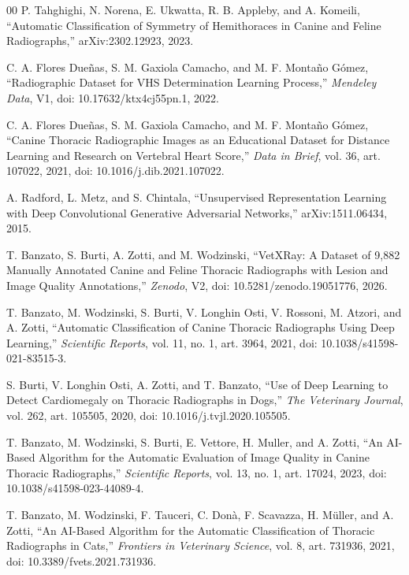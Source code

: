\documentclass[journal]{IEEEtran}
\begin{document}
\begin{thebibliography}{00}
P. Tahghighi, N. Norena, E. Ukwatta, R. B. Appleby, and A. Komeili,
``Automatic Classification of Symmetry of Hemithoraces in Canine and Feline Radiographs,''
arXiv:2302.12923, 2023.

C. A. Flores Dueñas, S. M. Gaxiola Camacho, and M. F. Montaño Gómez,
``Radiographic Dataset for VHS Determination Learning Process,''
\textit{Mendeley Data}, V1, doi: 10.17632/ktx4cj55pn.1, 2022.

C. A. Flores Dueñas, S. M. Gaxiola Camacho, and M. F. Montaño Gómez,
``Canine Thoracic Radiographic Images as an Educational Dataset for Distance Learning and Research on Vertebral Heart Score,''
\textit{Data in Brief}, vol. 36, art. 107022, 2021,
doi: 10.1016/j.dib.2021.107022.

A. Radford, L. Metz, and S. Chintala,
``Unsupervised Representation Learning with Deep Convolutional Generative Adversarial Networks,''
arXiv:1511.06434, 2015.

T. Banzato, S. Burti, A. Zotti, and M. Wodzinski,
``VetXRay: A Dataset of 9{,}882 Manually Annotated Canine and Feline Thoracic Radiographs with Lesion and Image Quality Annotations,''
\textit{Zenodo}, V2, doi: 10.5281/zenodo.19051776, 2026.

T. Banzato, M. Wodzinski, S. Burti, V. Longhin Osti, V. Rossoni, M. Atzori, and A. Zotti,
``Automatic Classification of Canine Thoracic Radiographs Using Deep Learning,''
\textit{Scientific Reports}, vol. 11, no. 1, art. 3964, 2021,
doi: 10.1038/s41598-021-83515-3.

S. Burti, V. Longhin Osti, A. Zotti, and T. Banzato,
``Use of Deep Learning to Detect Cardiomegaly on Thoracic Radiographs in Dogs,''
\textit{The Veterinary Journal}, vol. 262, art. 105505, 2020,
doi: 10.1016/j.tvjl.2020.105505.

T. Banzato, M. Wodzinski, S. Burti, E. Vettore, H. Muller, and A. Zotti,
``An AI-Based Algorithm for the Automatic Evaluation of Image Quality in Canine Thoracic Radiographs,''
\textit{Scientific Reports}, vol. 13, no. 1, art. 17024, 2023,
doi: 10.1038/s41598-023-44089-4.

T. Banzato, M. Wodzinski, F. Tauceri, C. Donà, F. Scavazza, H. Müller, and A. Zotti,
``An AI-Based Algorithm for the Automatic Classification of Thoracic Radiographs in Cats,''
\textit{Frontiers in Veterinary Science}, vol. 8, art. 731936, 2021,
doi: 10.3389/fvets.2021.731936.


\end{thebibliography}
\end{document}

